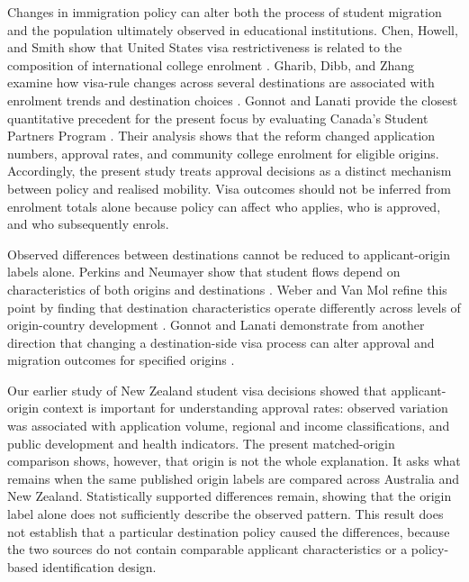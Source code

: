 \documentclass[runningheads]{llncs}
\begin{document}
Changes in immigration policy can alter both the process of student migration and the population ultimately observed in educational institutions. Chen, Howell, and Smith show that United States visa restrictiveness is related to the composition of international college enrolment \cite{Chen2023}. Gharib, Dibb, and Zhang examine how visa-rule changes across several destinations are associated with enrolment trends and destination choices \cite{GharibEtAl2026}. Gonnot and Lanati provide the closest quantitative precedent for the present focus by evaluating Canada's Student Partners Program \cite{Gonnot2025}. Their analysis shows that the reform changed application numbers, approval rates, and community college enrolment for eligible origins. Accordingly, the present study treats approval decisions as a distinct mechanism between policy and realised mobility. Visa outcomes should not be inferred from enrolment totals alone because policy can affect who applies, who is approved, and who subsequently enrols.

Observed differences between destinations cannot be reduced to applicant-origin labels alone. Perkins and Neumayer show that student flows depend on characteristics of both origins and destinations \cite{PerkinsNeumayer2014}. Weber and Van Mol refine this point by finding that destination characteristics operate differently across levels of origin-country development \cite{Weber2023}. Gonnot and Lanati demonstrate from another direction that changing a destination-side visa process can alter approval and migration outcomes for specified origins \cite{Gonnot2025}.

Our earlier study of New Zealand student visa decisions \cite{Kaplan2026NZVisaApproval} showed that applicant-origin context is important for understanding approval rates: observed variation was associated with application volume, regional and income classifications, and public development and health indicators. The present matched-origin comparison shows, however, that origin is not the whole explanation. It asks what remains when the same published origin labels are compared across Australia and New Zealand. Statistically supported differences remain, showing that the origin label alone does not sufficiently describe the observed pattern. This result does not establish that a particular destination policy caused the differences, because the two sources do not contain comparable applicant characteristics or a policy-based identification design.
\end{document}
